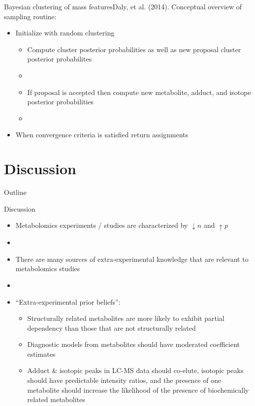\documentclass[xcolor=dvipsnames]{beamer}
\begin{document}
\begin{frame}{Bayesian clustering of mass features}{Daly, et al. (2014).}
	\vspace{-12pt}
	Conceptual overview of sampling routine: \pause
	
	\begin{itemize}
		\item Initialize with random clustering \pause
		\begin{itemize}
					\item Compute cluster posterior probabilities as well as new proposal cluster posterior probabilites \pause
					\item[]
					\item If proposal is accepted then compute new metabolite, adduct, and isotope posterior probabilities \pause
					\item[]
		\end{itemize}
		\item When convergence criteria is satisfied return assignments 
	\end{itemize}
\end{frame}

\section{Discussion}

\begin{frame}{Outline}
	\vspace{-10.5pt}
	\tableofcontents[currentsection,subsectionstyle=hide]
\end{frame}

\begin{frame}{Discussion}
	\vspace{-10.5pt}
	\begin{itemize}
		\item Metabolomics experiments / studies are characterized by $\downarrow n$ and $\uparrow p$ \pause
		\item[]
		\item There are many sources of extra-experimental knowledge that are relevant to metabolomics studies \pause
		\item[] 
		\item ``Extra-experimental prior beliefs'': \pause
		\begin{itemize}
			\item Structurally related metabolites are more likely to exhibit partial dependency than those that are not structurally related \pause
			\item Diagnostic models from metabolites should have moderated coefficient estimates \pause
			\item Adduct \& isotopic peaks in LC-MS data should co-elute, isotopic peaks should have predictable intensity ratios, and the presence of one metabolite should increase the likelihood of the presence of biochemically related metabolites
		\end{itemize}
	\end{itemize}
\end{frame}
\end{document}
